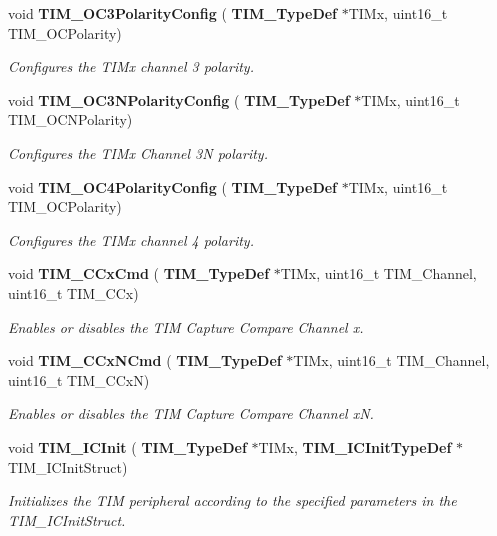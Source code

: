 \begin{DoxyCompactItemize}
void \textbf{ T\+I\+M\+\_\+\+O\+C3\+Polarity\+Config} (\textbf{ T\+I\+M\+\_\+\+Type\+Def} $\ast$T\+I\+Mx, uint16\+\_\+t T\+I\+M\+\_\+\+O\+C\+Polarity)
\begin{DoxyCompactList}\small\item\em Configures the T\+I\+Mx channel 3 polarity. \end{DoxyCompactList}\item 
void \textbf{ T\+I\+M\+\_\+\+O\+C3\+N\+Polarity\+Config} (\textbf{ T\+I\+M\+\_\+\+Type\+Def} $\ast$T\+I\+Mx, uint16\+\_\+t T\+I\+M\+\_\+\+O\+C\+N\+Polarity)
\begin{DoxyCompactList}\small\item\em Configures the T\+I\+Mx Channel 3N polarity. \end{DoxyCompactList}\item 
void \textbf{ T\+I\+M\+\_\+\+O\+C4\+Polarity\+Config} (\textbf{ T\+I\+M\+\_\+\+Type\+Def} $\ast$T\+I\+Mx, uint16\+\_\+t T\+I\+M\+\_\+\+O\+C\+Polarity)
\begin{DoxyCompactList}\small\item\em Configures the T\+I\+Mx channel 4 polarity. \end{DoxyCompactList}\item 
void \textbf{ T\+I\+M\+\_\+\+C\+Cx\+Cmd} (\textbf{ T\+I\+M\+\_\+\+Type\+Def} $\ast$T\+I\+Mx, uint16\+\_\+t T\+I\+M\+\_\+\+Channel, uint16\+\_\+t T\+I\+M\+\_\+\+C\+Cx)
\begin{DoxyCompactList}\small\item\em Enables or disables the T\+IM Capture Compare Channel x. \end{DoxyCompactList}\item 
void \textbf{ T\+I\+M\+\_\+\+C\+Cx\+N\+Cmd} (\textbf{ T\+I\+M\+\_\+\+Type\+Def} $\ast$T\+I\+Mx, uint16\+\_\+t T\+I\+M\+\_\+\+Channel, uint16\+\_\+t T\+I\+M\+\_\+\+C\+CxN)
\begin{DoxyCompactList}\small\item\em Enables or disables the T\+IM Capture Compare Channel xN. \end{DoxyCompactList}\item 
void \textbf{ T\+I\+M\+\_\+\+I\+C\+Init} (\textbf{ T\+I\+M\+\_\+\+Type\+Def} $\ast$T\+I\+Mx, \textbf{ T\+I\+M\+\_\+\+I\+C\+Init\+Type\+Def} $\ast$T\+I\+M\+\_\+\+I\+C\+Init\+Struct)
\begin{DoxyCompactList}\small\item\em Initializes the T\+IM peripheral according to the specified parameters in the T\+I\+M\+\_\+\+I\+C\+Init\+Struct. \end{DoxyCompactList}\item 

\end{DoxyCompactItemize}
